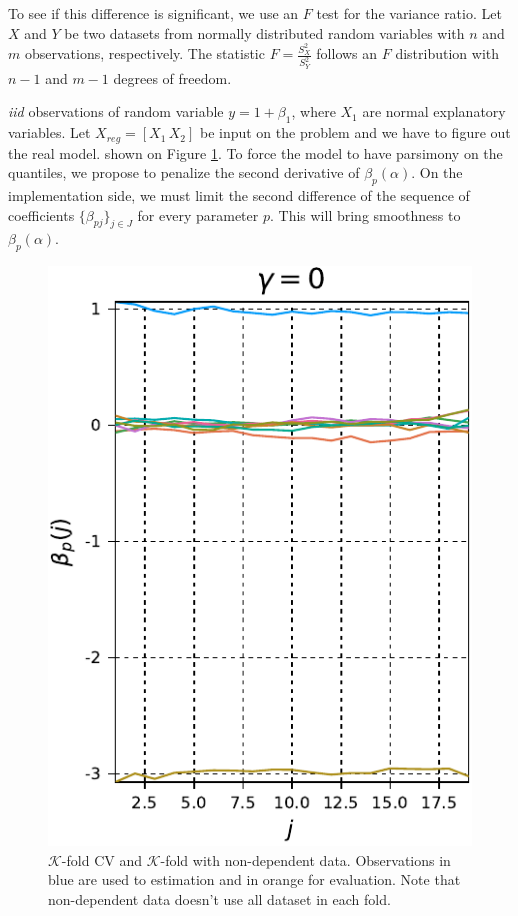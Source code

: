 To see if this difference is significant, we use an $F$ test for the variance ratio. Let $X$ and $Y$ be two datasets from normally distributed random variables with $n$ and $m$ observations, respectively. The statistic $F = \frac{S^2_X}{S^2_Y}$ follows an $F$ distribution with $n-1$ and $m-1$ degrees of freedom.


\textit{iid} observations of random variable $y= 1 + \beta_1 $, where $X_1$ are normal explanatory variables. Let $X_{reg} = [X_1 \, X_2]$ be input on the problem and we have to figure out the real model.   shown on Figure \ref{fig:lasso-selection-normal}.
To force the model to have parsimony on the quantiles, we propose to penalize the second derivative of $\beta_p(\alpha)$. 
On the implementation side, we must limit the second difference of the sequence of coefficients $\{\beta_{pj}\}_{j \in J}$ for every parameter $p$. This will bring smoothness to $\beta_p(\alpha)$.
\begin{figure}
	\centering
	\includegraphics[width=0.5\linewidth]{Images/Lambda10-gamma03-cropped}
	\caption{$\mathcal{K}$-fold CV and $\mathcal{K}$-fold with non-dependent data. Observations in blue are used to estimation and in orange for evaluation. Note that non-dependent data doesn't use all dataset in each fold.}
	\label{fig:lasso-selection-normal}
\end{figure}

